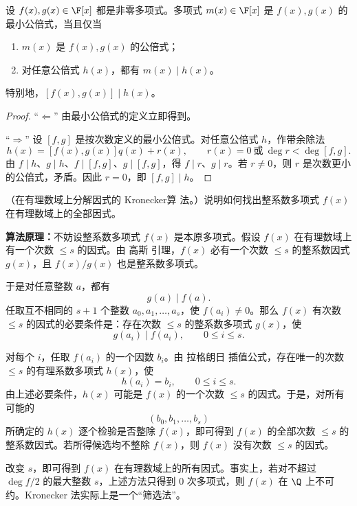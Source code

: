\begin{corollary}
	设 \(f(x),g(x)\in\F[x]\) 都是非零多项式。多项式 \(m(x)\in\F[x]\) 是 \(f(x),g(x)\) 的最小公倍式，当且仅当
	\begin{enumerate}
		\item \(m(x)\) 是 \(f(x),g(x)\) 的公倍式；
		\item 对任意公倍式 \(h(x)\)，都有 \(m(x)\mid h(x)\)。
	\end{enumerate}
	特别地，\([f(x),g(x)]\mid h(x)\)。
\end{corollary}

\begin{proof}
	``\(\Leftarrow\)'' 由最小公倍式的定义立即得到。
	
	``\(\Rightarrow\)'' 设 \([f,g]\) 是按次数定义的最小公倍式。对任意公倍式 \(h\)，作带余除法
	\[
	h(x)=[f(x),g(x)]q(x)+r(x),
	\qquad r(x)=0\ \text{或}\ \deg r<\deg[f,g].
	\]
	由 \(f\mid h\)、\(g\mid h\)、\(f\mid[f,g]\)、\(g\mid[f,g]\)，得 \(f\mid r\)、\(g\mid r\)。若 \(r\ne0\)，则 \(r\) 是次数更小的公倍式，矛盾。因此 \(r=0\)，即 \([f,g]\mid h\)。
\end{proof}

\begin{problem}
（在有理数域上分解因式的 Kronecker算 法。）说明如何找出整系数多项式 \(f(x)\) 在有理数域上的全部因式。
\end{problem}

\begin{solution}
	\textbf{算法原理：}不妨设整系数多项式 \(f(x)\) 是本原多项式。假设 \(f(x)\) 在有理数域上有一个次数 \(\le s\) 的因式。由 高斯 引理，\(f(x)\) 必有一个次数 \(\le s\) 的整系数因式 \(g(x)\)，且 \(f(x)/g(x)\) 也是整系数多项式。
	
	于是对任意整数 \(a\)，都有
	\[
	g(a)\mid f(a).
	\]
	任取互不相同的 \(s+1\) 个整数 \(a_0,a_1,\ldots,a_s\)，使 \(f(a_i)\ne0\)。那么 \(f(x)\) 有次数 \(\le s\) 的因式的必要条件是：存在次数 \(\le s\) 的整系数多项式 \(g(x)\)，使
	\[
	g(a_i)\mid f(a_i),
	\qquad 0\le i\le s.
	\]
	
	对每个 \(i\)，任取 \(f(a_i)\) 的一个因数 \(b_i\)。由 拉格朗日 插值公式，存在唯一的次数 \(\le s\) 的有理系数多项式 \(h(x)\)，使
	\[
	h(a_i)=b_i,
	\qquad 0\le i\le s.
	\]
	由上述必要条件，\(h(x)\) 可能是 \(f(x)\) 的一个次数 \(\le s\) 的因式。于是，对所有可能的
	\[
	(b_0,b_1,\ldots,b_s)
	\]
	所确定的 \(h(x)\) 逐个检验是否整除 \(f(x)\)，即可得到 \(f(x)\) 的全部次数 \(\le s\) 的整系数因式。若所得候选均不整除 \(f(x)\)，则 \(f(x)\) 没有次数 \(\le s\) 的因式。
	
	改变 \(s\)，即可得到 \(f(x)\) 在有理数域上的所有因式。事实上，若对不超过 \(\deg f/2\) 的最大整数 \(s\)，上述方法只得到 \(0\) 次多项式，则 \(f(x)\) 在 \(\Q\) 上不可约。Kronecker 法实际上是一个“筛选法”。
\end{solution}

